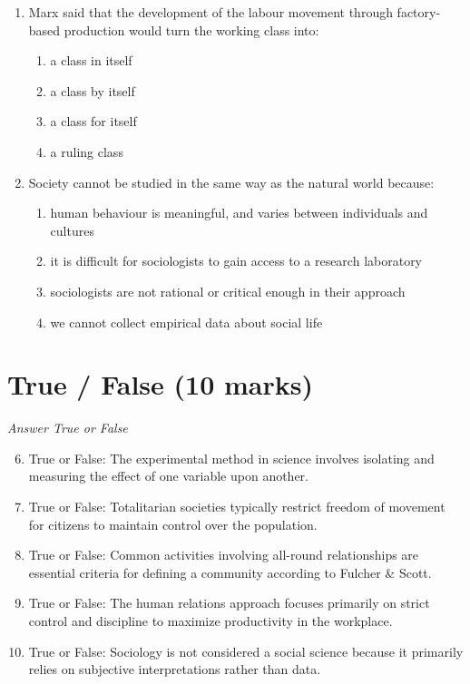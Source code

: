 \documentclass[12pt]{article}
\begin{document}
\begin{enumerate}[label=\arabic*.]
\item Marx said that the development of the labour movement through factory-based production would turn the working class into:
\begin{enumerate}[label=(\alph*)]
    \item a class in itself
    \item a class by itself
    \item a class for itself
    \item a ruling class
\end{enumerate}
\item Society cannot be studied in the same way as the natural world because:
\begin{enumerate}[label=(\alph*)]
    \item human behaviour is meaningful, and varies between individuals and cultures
    \item it is difficult for sociologists to gain access to a research laboratory
    \item sociologists are not rational or critical enough in their approach
    \item we cannot collect empirical data about social life
\end{enumerate}
\end{enumerate}

\section*{True / False (10 marks)}
\textit{Answer True or False}
\begin{enumerate}[label=\arabic*.]
\setcounter{enumi}{5}
\item True or False: The experimental method in science involves isolating and measuring the effect of one variable upon another.
\item True or False: Totalitarian societies typically restrict freedom of movement for citizens to maintain control over the population.
\item True or False: Common activities involving all-round relationships are essential criteria for defining a community according to Fulcher \& Scott.
\item True or False: The human relations approach focuses primarily on strict control and discipline to maximize productivity in the workplace.
\item True or False: Sociology is not considered a social science because it primarily relies on subjective interpretations rather than data.
\end{enumerate}
\end{document}
